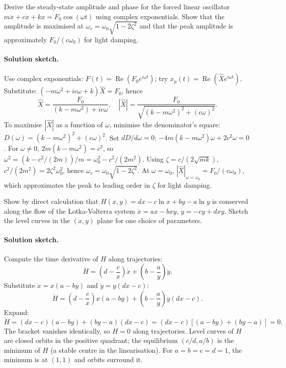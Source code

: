 \begin{exercise}
Derive the steady-state amplitude and phase for the forced linear
oscillator $m \ddot{x} + c \dot{x} + k x = F_{0}\cos(\omega t)$
using complex exponentials. Show that the amplitude is maximised
at $\omega_{r} = \omega_{0}\sqrt{1 - 2\zeta^{2}}$ and that the
peak amplitude is approximately $F_{0}/(c\omega_{0})$ for light
damping.

\paragraph{Solution sketch.} Use complex exponentials: $F(t) =
\operatorname{Re}(F_{0} e^{i \omega t})$; try $x_{p}(t) =
\operatorname{Re}(\hat{X} e^{i \omega t})$. Substitute: $(-m
\omega^{2} + i c \omega + k) \hat{X} = F_{0}$, hence
\[
\hat{X} = \frac{F_{0}}{(k - m \omega^{2}) + i c \omega},
\quad |\hat{X}| = \frac{F_{0}}{\sqrt{(k - m \omega^{2})^{2} + (c
\omega)^{2}}}.
\]
To maximise $|\hat{X}|$ as a function of $\omega$, minimise the
denominator's square: $D(\omega) = (k - m \omega^{2})^{2} + (c
\omega)^{2}$. Set $dD/d\omega = 0$: $-4 m (k - m \omega^{2})
\omega + 2 c^{2} \omega = 0$. For $\omega \neq 0$, $2 m (k - m
\omega^{2}) = c^{2}$, so $\omega^{2} = (k - c^{2}/(2 m))/m =
\omega_{0}^{2} - c^{2}/(2 m^{2})$. Using $\zeta = c/(2 \sqrt{m k})$,
$c^{2}/(2 m^{2}) = 2 \zeta^{2} \omega_{0}^{2}$, hence $\omega_{r}
= \omega_{0} \sqrt{1 - 2 \zeta^{2}}$. At $\omega = \omega_{0}$,
$|\hat{X}|_{\omega = \omega_{0}} = F_{0}/(c \omega_{0})$, which
approximates the peak to leading order in $\zeta$ for light
damping.
\end{exercise}

\begin{exercise}
Show by direct calculation that $H(x, y) = d x - c \ln x + b y -
a \ln y$ is conserved along the flow of the Lotka-Volterra system
$\dot{x} = a x - b x y$, $\dot{y} = -c y + d x y$. Sketch the
level curves in the $(x, y)$ plane for one choice of parameters.

\paragraph{Solution sketch.} Compute the time derivative of $H$
along trajectories:
\[
\dot{H} = \left(d - \frac{c}{x}\right) \dot{x} + \left(b - \frac{a}
{y}\right) \dot{y}.
\]
Substitute $\dot{x} = x(a - b y)$ and $\dot{y} = y(d x - c)$:
\[
\dot{H} = \left(d - \frac{c}{x}\right) x (a - b y) + \left(b -
\frac{a}{y}\right) y (d x - c).
\]
Expand:
\[
\dot{H} = (d x - c)(a - b y) + (b y - a)(d x - c) = (d x - c)
[(a - b y) + (b y - a)] = 0.
\]
The bracket vanishes identically, so $\dot{H} = 0$ along
trajectories. Level curves of $H$ are closed orbits in the
positive quadrant; the equilibrium $(c/d, a/b)$ is the minimum of
$H$ (a stable centre in the linearisation). For $a = b = c = d =
1$, the minimum is at $(1, 1)$ and orbits surround it.
\end{exercise}

